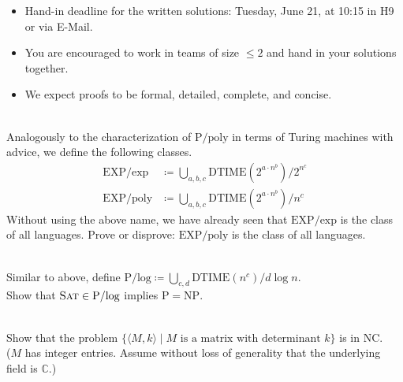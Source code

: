 \documentclass[english]{uebung_cs}
\begin{document}
\begin{itemize}
  \item Hand-in deadline for the written solutions: Tuesday, June 21, at 10:15 in H9 or via E-Mail.
  \item You are encouraged to work in teams of size $\le 2$ and hand in your solutions together.
  \item We expect proofs to be formal, detailed, complete, and concise.
\end{itemize}

\begin{aufgabe}\mbox{}\\
  Analogously to the characterization of $\mathrm{P}/\text{poly}$ in terms of Turing machines with advice, we define the following classes.
  \begin{align*}
    \mathrm{EXP}/\text{exp} &\coloneqq \bigcup_{a,b,c} \mathrm{DTIME}(2^{a\cdot n^b})/2^{n^c}\\
    \mathrm{EXP}/\text{poly} &\coloneqq \bigcup_{a,b,c} \mathrm{DTIME}(2^{a\cdot n^b})/n^c
  \end{align*}
  Without using the above name, we have already seen that $\mathrm{EXP}/\text{exp}$ is the class of all languages.
  Prove or disprove: $\mathrm{EXP}/\text{poly}$ is the class of all languages.
\end{aufgabe}

\begin{aufgabe}\mbox{}\\
  Similar to above, define $\mathrm{P}/\text{log} \coloneqq \bigcup_{c,d} \mathrm{DTIME}(n^c)/d\log n$.\\
  Show that $\textsc{Sat} \in \mathrm{P}/\text{log}$ implies $\mathrm{P} = \mathrm{NP}$.
\end{aufgabe}

\begin{aufgabe}\mbox{}\\
  Show that the problem $\{\langle M, k \rangle \mid M \text{ is a matrix with determinant } k\}$ is in $\mathrm{NC}$.\\
  ($M$ has integer entries. Assume without loss of generality that the underlying field is $\mathbb{C}$.)
\end{aufgabe}
\end{document}
